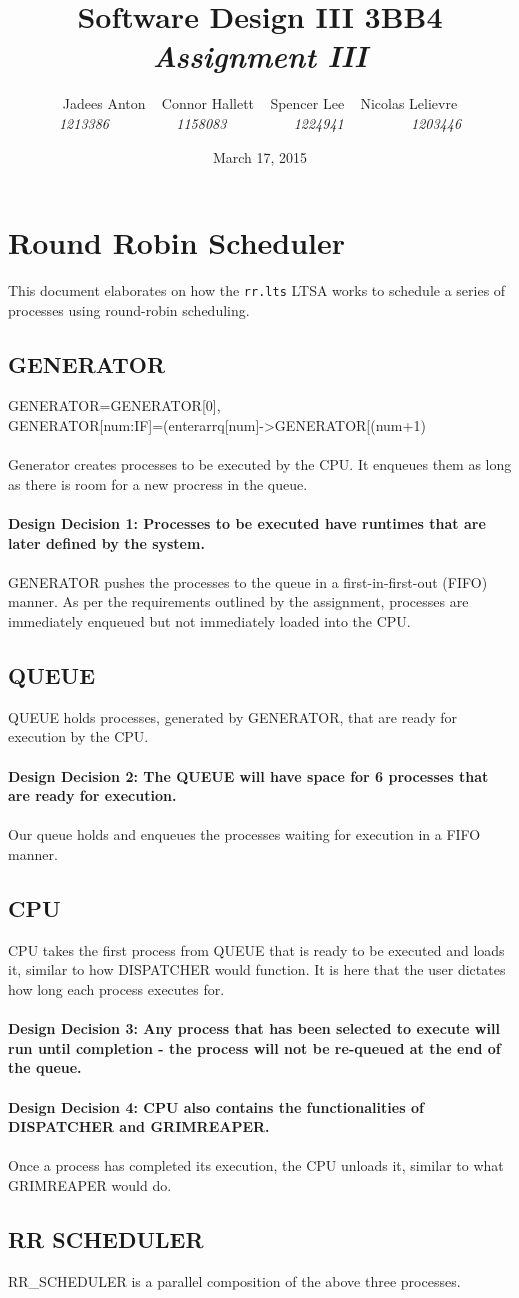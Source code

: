 \documentclass[]{article}
\title{\textbf{Software Design III 3BB4} \\ \textit{Assignment III}}
\date{March 17, 2015}
\author{Jadees Anton {\ } Connor Hallett {\ } Spencer Lee {\ } Nicolas Lelievre \\ \textit{1213386 {\ }{\ }{\ }{\ }{\ }{\ }{\ }{\ } 1158083 {\ }{\ }{\ }{\ }{\ }{\ }{\ }{\ } 1224941 {\ }{\ }{\ }{\ }{\ }{\ }{\ }{\ } 1203446}}
\begin{document}
\maketitle
\setlength{\pdfpagewidth}{8.5in}
\setlength{\pdfpageheight}{11in}

\section*{Round Robin Scheduler}
This document elaborates on how the \verb|rr.lts| LTSA works to schedule a series of processes using round-robin scheduling.
	
\subsection*{GENERATOR}
GENERATOR=GENERATOR[0],\\
GENERATOR[num:IF]=(enterarrq[num]->GENERATOR[(num+1)%
\\
\\Generator creates processes to be executed by the CPU. It enqueues them as long as there is room for a new procress in the queue.\\\
\\
\textbf{ Design Decision 1: Processes to be executed have runtimes that are later defined by the system.} 
\\
\\GENERATOR pushes the processes to the queue in a first-in-first-out (FIFO) manner. As per the requirements outlined by the assignment,  processes are immediately enqueued but not immediately loaded into the CPU. 

\subsection*{QUEUE}
QUEUE holds processes, generated by GENERATOR, that are ready for execution by the CPU. \\
\\
\textbf{Design Decision 2: The QUEUE will have space for 6 processes that are ready for execution.}
\\
\\Our queue holds and enqueues the processes waiting for execution in a FIFO manner. 

\subsection*{CPU}
CPU takes the first process from QUEUE that is ready to be executed and loads it, similar to how DISPATCHER would function. It is here that the user dictates how long each process executes for.\\
\\
\textbf{Design Decision 3: Any process that has been selected to execute will run until completion - the process will not be re-queued at the end of the queue. \\
\\Design Decision 4: CPU also contains the functionalities of DISPATCHER and GRIMREAPER.}
\\
\\Once a process has completed its execution, the CPU unloads it, similar to what GRIMREAPER would do. 
\subsection*{RR SCHEDULER}
RR_SCHEDULER is a parallel composition of the above three processes.
\end{document}
